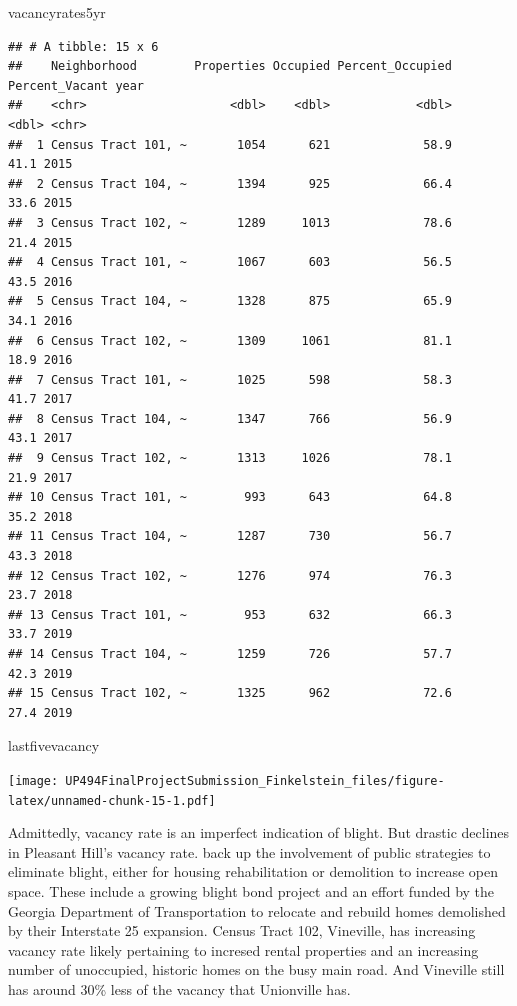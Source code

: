 \documentclass[
]{article}
\newenvironment{Shaded}{\begin{snugshade}}{\end{snugshade}}
\newcommand{\NormalTok}[1]{#1}
\begin{document}
\begin{Shaded}
\begin{Highlighting}[]
\NormalTok{vacancyrates5yr}
\end{Highlighting}
\end{Shaded}

\begin{verbatim}
## # A tibble: 15 x 6
##    Neighborhood        Properties Occupied Percent_Occupied Percent_Vacant year 
##    <chr>                    <dbl>    <dbl>            <dbl>          <dbl> <chr>
##  1 Census Tract 101, ~       1054      621             58.9           41.1 2015 
##  2 Census Tract 104, ~       1394      925             66.4           33.6 2015 
##  3 Census Tract 102, ~       1289     1013             78.6           21.4 2015 
##  4 Census Tract 101, ~       1067      603             56.5           43.5 2016 
##  5 Census Tract 104, ~       1328      875             65.9           34.1 2016 
##  6 Census Tract 102, ~       1309     1061             81.1           18.9 2016 
##  7 Census Tract 101, ~       1025      598             58.3           41.7 2017 
##  8 Census Tract 104, ~       1347      766             56.9           43.1 2017 
##  9 Census Tract 102, ~       1313     1026             78.1           21.9 2017 
## 10 Census Tract 101, ~        993      643             64.8           35.2 2018 
## 11 Census Tract 104, ~       1287      730             56.7           43.3 2018 
## 12 Census Tract 102, ~       1276      974             76.3           23.7 2018 
## 13 Census Tract 101, ~        953      632             66.3           33.7 2019 
## 14 Census Tract 104, ~       1259      726             57.7           42.3 2019 
## 15 Census Tract 102, ~       1325      962             72.6           27.4 2019
\end{verbatim}

\begin{Shaded}
\begin{Highlighting}[]
\NormalTok{lastfivevacancy}
\end{Highlighting}
\end{Shaded}

\texttt{[image: UP494FinalProjectSubmission\_Finkelstein\_files/figure-latex/unnamed-chunk-15-1.pdf]}

Admittedly, vacancy rate is an imperfect indication of blight. But
drastic declines in Pleasant Hill's vacancy rate. back up the
involvement of public strategies to eliminate blight, either for housing
rehabilitation or demolition to increase open space. These include a
growing blight bond project and an effort funded by the Georgia
Department of Transportation to relocate and rebuild homes demolished by
their Interstate 25 expansion. Census Tract 102, Vineville, has
increasing vacancy rate likely pertaining to incresed rental properties
and an increasing number of unoccupied, historic homes on the busy main
road. And Vineville still has around 30\% less of the vacancy that
Unionville has.
\end{document}
